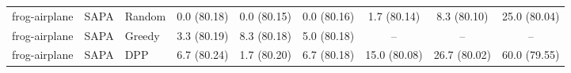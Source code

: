 \begin{table}[h]
{\begin{tabular}{lllcccccc}
frog-airplane & SAPA & Random
& 0.0 \small{(80.18)}
& 0.0 \small{(80.15)}
& 0.0 \small{(80.16)}
& 1.7 \small{(80.14)}
& 8.3 \small{(80.10)}
& 25.0 \small{(80.04)} \\

frog-airplane & SAPA & Greedy
& 3.3 \small{(80.19)}
& 8.3 \small{(80.18)}
& 5.0 \small{(80.18)}
& --
& --
& -- \\

frog-airplane & SAPA & DPP
& 6.7 \small{(80.24)}
& 1.7 \small{(80.20)}
& 6.7 \small{(80.18)}
& 15.0 \small{(80.08)}
& 26.7 \small{(80.02)}
& 60.0 \small{(79.55)} \\


\hline
\end{tabular}
}
\end{table}
